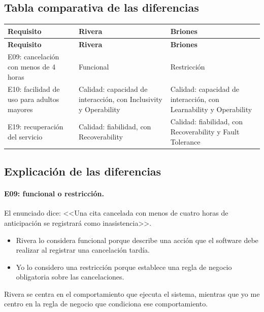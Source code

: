 \documentclass[11pt,a4paper]{article}
\begin{document}
\subsection{Tabla comparativa de las diferencias}

{\small
\setlength{\tabcolsep}{4pt}
\begin{longtable}{L{3.8cm}L{6.0cm}L{6.0cm}}
\toprule
\textbf{Requisito} & \textbf{Rivera} & \textbf{Briones} \\
\midrule
\endfirsthead
\toprule
\textbf{Requisito} & \textbf{Rivera} & \textbf{Briones} \\
\midrule
\endhead
\bottomrule
\endfoot
E09: cancelación con menos de 4 horas & Funcional & Restricción \\
E10: facilidad de uso para adultos mayores & Calidad: capacidad de interacción, con Inclusivity y Operability & Calidad: capacidad de interacción, con Learnability y Operability \\
E19: recuperación del servicio & Calidad: fiabilidad, con Recoverability & Calidad: fiabilidad, con Recoverability y Fault Tolerance \\
\end{longtable}
}

\subsection{Explicación de las diferencias}

\paragraph{E09: funcional o restricción.} El enunciado dice: <<Una cita cancelada con menos de cuatro horas de anticipación se registrará como inasistencia>>.
\begin{itemize}
\item Rivera lo considera funcional porque describe una acción que el software debe realizar al registrar una cancelación tardía.
\item Yo lo considero una restricción porque establece una regla de negocio obligatoria sobre las cancelaciones.
\end{itemize}
Rivera se centra en el comportamiento que ejecuta el sistema, mientras que yo me centro en la regla de negocio que condiciona ese comportamiento.
\end{document}
